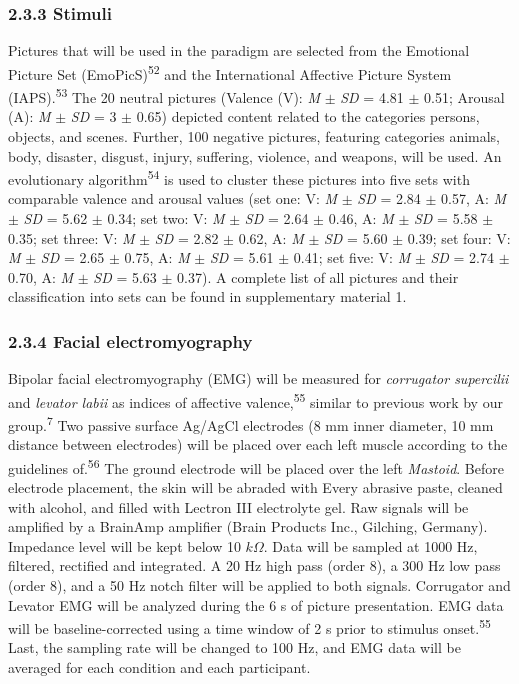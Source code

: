 \documentclass[
  english,
  man,floatsintext]{apa6}
\begin{document}
\hypertarget{stimuli}{%
\subsubsection{2.3.3 Stimuli}\label{stimuli}}

Pictures that will be used in the paradigm are selected from the Emotional Picture Set (EmoPicS)\textsuperscript{52} and the International Affective Picture System (IAPS).\textsuperscript{53}
The 20 neutral pictures (Valence (V): \emph{M} \(\pm\) \emph{SD} = 4.81 \(\pm\) 0.51; Arousal (A): \emph{M} \(\pm\) \emph{SD} = 3 \(\pm\) 0.65) depicted content related to the categories persons, objects, and scenes.
Further, 100 negative pictures, featuring categories animals, body, disaster, disgust, injury, suffering, violence, and weapons, will be used.
An evolutionary algorithm\textsuperscript{54} is used to cluster these pictures into five sets with comparable valence and arousal values (set one: V: \emph{M} \(\pm\) \emph{SD} = 2.84 \(\pm\) 0.57, A: \emph{M} \(\pm\) \emph{SD} = 5.62 \(\pm\) 0.34; set two: V: \emph{M} \(\pm\) \emph{SD} = 2.64 \(\pm\) 0.46, A: \emph{M} \(\pm\) \emph{SD} = 5.58 \(\pm\) 0.35; set three: V: \emph{M} \(\pm\) \emph{SD} = 2.82 \(\pm\) 0.62, A: \emph{M} \(\pm\) \emph{SD} = 5.60 \(\pm\) 0.39; set four: V: \emph{M} \(\pm\) \emph{SD} = 2.65 \(\pm\) 0.75, A: \emph{M} \(\pm\) \emph{SD} = 5.61 \(\pm\) 0.41; set five: V: \emph{M} \(\pm\) \emph{SD} = 2.74 \(\pm\) 0.70, A: \emph{M} \(\pm\) \emph{SD} = 5.63 \(\pm\) 0.37).
A complete list of all pictures and their classification into sets can be found in supplementary material 1.

\hypertarget{facial-electromyography}{%
\subsubsection{2.3.4 Facial electromyography}\label{facial-electromyography}}

Bipolar facial electromyography (EMG) will be measured for \emph{corrugator supercilii} and \emph{levator labii} as indices of affective valence,\textsuperscript{55} similar to previous work by our group.\textsuperscript{7}
Two passive surface Ag/AgCl electrodes (8 mm inner diameter, 10 mm distance between electrodes) will be placed over each left muscle according to the guidelines of.\textsuperscript{56}
The ground electrode will be placed over the left \emph{Mastoid}.
Before electrode placement, the skin will be abraded with Every abrasive paste, cleaned with alcohol, and filled with Lectron III electrolyte gel.
Raw signals will be amplified by a BrainAmp amplifier (Brain Products Inc., Gilching, Germany).
Impedance level will be kept below 10 \(k\Omega\).
Data will be sampled at 1000 Hz, filtered, rectified and integrated.
A 20 Hz high pass (order 8), a 300 Hz low pass (order 8), and a 50 Hz notch filter will be applied to both signals.
Corrugator and Levator EMG will be analyzed during the 6 s of picture presentation.
EMG data will be baseline-corrected using a time window of 2 s prior to stimulus onset.\textsuperscript{55}
Last, the sampling rate will be changed to 100 Hz, and EMG data will be averaged for each condition and each participant.
\end{document}
